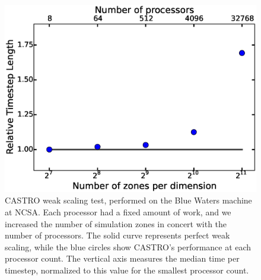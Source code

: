\documentclass[iop]{emulateapj}
\begin{document}
\begin{figure}
  \centering
  \includegraphics[scale=0.4]{plots/weak_scaling}
  \caption{CASTRO weak scaling test, performed on the Blue Waters machine at 
    NCSA. Each processor had a fixed amount of work, and we increased the 
    number of simulation zones in concert with the number of processors. The 
    solid curve represents perfect weak scaling, while the blue circles show 
    CASTRO's performance at each processor count. The vertical axis measures 
    the median time per timestep, normalized to this value for the smallest 
    processor count.\label{fig:weak_scaling}}
\end{figure}
\end{document}
